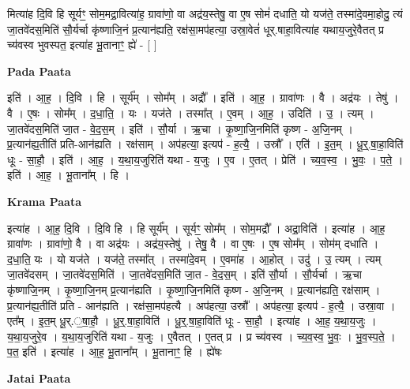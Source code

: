 \documentclass[17pt]{extarticle}
\begin{document}
मित्या॑ह दि॒वि हि सूर्यꣳ॒॒ सोम॒मद्रा॒वित्या॑ह॒ ग्रावा॑णो॒ वा अद्र॑य॒स्तेषु॒ वा ए॒ष सोमं॑ दधाति॒ यो यज॑ते॒ तस्मा॑दे॒वमा॒होदु॒ त्यं जा॒तवे॑दस॒मिति॑ सौ॒र्यर्चा कृ॑ष्णाजि॒नं प्र॒त्यान॑ह्यति॒ रक्ष॑सा॒मप॑हत्या॒ उस्रा॒वेतं॑ धूर्.षाहा॒वित्या॑ह यथाय॒जुरे॒वैतत् प्र च्य॑वस्व भुवस्पत॒ इत्या॑ह भू॒तानाꣳ॒॒ ह्ये॑ - [  ] \newline

\textbf{Pada Paata} \newline

इति॑ । आ॒ह॒ । दि॒वि । हि । सूर्य᳚म् । सोम᳚म् । अद्रौ᳚ । इति॑ । आ॒ह॒ । ग्रावा॑णः । वै । अद्र॑यः । तेषु॑ । वै । ए॒षः । सोम᳚म् । द॒धा॒ति॒ । यः । यज॑ते । तस्मा᳚त् । ए॒वम् । आ॒ह॒ । उदिति॑ । उ॒ । त्यम् । जा॒तवे॑दस॒मिति॑ जा॒त - वे॒द॒स॒म् । इति॑ । सौ॒र्या । ऋ॒चा । कृ॒ष्णा॒जि॒नमिति॑ कृष्ण - अ॒जि॒नम् । प्र॒त्यान॑ह्य॒तीति॑ प्रति-आन॑ह्यति । रक्ष॑साम् । अप॑हत्या॒ इत्यप॑ - ह॒त्यै॒ । उस्रौ᳚ । एति॑ । इ॒त॒म् । धू॒र्॒.षा॒हा॒विति॑ धूः - सा॒हौ॒ । इति॑ । आ॒ह॒ । य॒था॒य॒जुरिति॑ यथा - य॒जुः । ए॒व । ए॒तत् । प्रेति॑ । च्य॒व॒स्व॒ । भु॒वः॒ । प॒ते॒ । इति॑ । आ॒ह॒ । भू॒ताना᳚म् । हि ।  \newline


\textbf{Krama Paata} \newline

इत्या॑ह । आ॒ह॒ दि॒वि । दि॒वि हि । हि सूर्य᳚म् । सूर्यꣳ॒॒ सोम᳚म् । सोम॒मद्रौ᳚ । अद्रा॒विति॑ । इत्या॑ह । आ॒ह॒ ग्रावा॑णः । ग्रावा॑णो॒ वै । वा अद्र॑यः । अद्र॑य॒स्तेषु॑ । तेषु॒ वै । वा ए॒षः । ए॒ष सोम᳚म् । सोम॑म् दधाति । द॒धा॒ति॒ यः । यो यज॑ते । यज॑ते॒ तस्मा᳚त् । तस्मा॑दे॒वम् । ए॒वमा॑ह । आ॒होत् । उदु॑ । उ॒ त्यम् । त्यम् जा॒तवे॑दसम् । जा॒तवे॑दस॒मिति॑ । जा॒तवे॑दस॒मिति॑ जा॒त - वे॒द॒स॒म् । इति॑ सौ॒र्या । सौ॒र्यर्चा । ऋ॒चा कृ॑ष्णाजि॒नम् । कृ॒ष्णा॒जि॒नम् प्र॒त्यान॑ह्यति । कृ॒ष्णा॒जि॒नमिति॑ कृष्ण - अ॒जि॒नम् । प्र॒त्यान॑ह्यति॒ रक्ष॑साम् । प्र॒त्यान॑ह्य॒तीति॑ प्रति - आन॑ह्यति । रक्ष॑सा॒मप॑हत्यै । अप॑हत्या॒ उस्रौ᳚ । अप॑हत्या॒ इत्यप॑ - ह॒त्यै॒ । उस्रा॒वा । एत᳚म् । इ॒त॒म् धू॒र्.॒षा॒हौ॒ । धू॒र्॒.षा॒हा॒विति॑ । धू॒र्॒.षा॒हा॒विति॑ धूः - सा॒हौ॒ । इत्या॑ह । आ॒ह॒ य॒था॒य॒जुः । य॒था॒य॒जुरे॒व । य॒था॒य॒जुरिति॑ यथा - य॒जुः । ए॒वैतत् । ए॒तत् प्र । प्र च्य॑वस्व । च्य॒व॒स्व॒ भु॒वः॒ । भु॒व॒स्प॒ते॒ । प॒त॒ इति॑ । इत्या॑ह । आ॒ह॒ भू॒ताना᳚म् । भू॒तानाꣳ॒॒ हि । ह्ये॑षः \newline

\textbf{Jatai Paata} \newline
\end{document}
